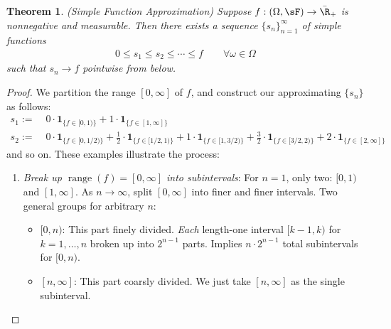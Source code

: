 \documentclass[12pt]{article}
\theoremstyle{plain}
\newtheorem{thm}{Theorem}[section]
\theoremstyle{definition}
\theoremstyle{remark}
\newcommand{\ra}{\rightarrow}
\newcommand{\one}[1]{\mathbf{1}_{#1}}
\newcommand{\range}{\operatorname{range}}
\newcommand{\ninf}{_{n=1}^\infty}
\begin{document}
\begin{thm}\emph{(Simple Function Approximation)}
\label{lebapprox}
Suppose $f: (\Omega,\sF)\rightarrow \bar{\R}_+$ is nonnegative and
measurable. Then there exists a sequence $\{s_n\}\ninf$ of simple
functions
\begin{align*}
    0 \leq s_1 \leq s_2 \leq \cdots \leq f
    \qquad \forall \omega\in \Omega
\end{align*}
such that $s_n\rightarrow f$ pointwise from below.
\end{thm}
\begin{proof}
We partition the range $[0,\infty]$ of $f$, and construct our
approximating $\{s_n\}$ as follows:
\begin{align*}
  s_1 := &\; 0\cdot \one{\{f\in [0,1)\}}
        + 1 \cdot \one{\{f\in [1,\infty]\}} \\
      s_2 :=&\; 0\cdot \one{\{f\in [0,1/2)\}}
        + \frac{1}{2} \cdot \one{\{f\in [1/2,1)\}}
        + 1 \cdot \one{\{f\in [1,3/2)\}}
          + \frac{3}{2} \cdot \one{\{f\in [3/2,2)\}}
        + 2 \cdot \one{\{f\in [2,\infty]\}}
\end{align*}
and so on.
These examples illustrate the process:
\begin{enumerate}[label=(\roman*)]
  \item \emph{Break up $\range(f)=[0,\infty]$ into subintervals}:
    For $n=1$, only two: $[0,1)$ and $[1,\infty]$.
    As $n\ra\infty$, split $[0,\infty]$ into finer and finer intervals.
    Two general groups for arbitrary $n$:
    \begin{itemize}
      \item $[0,n)$: This part finely divided.
        \emph{Each} length-one interval $[k-1,k)$ for $k=1,\ldots,n$
        broken up into $2^{n-1}$ parts.
        Implies $n\cdot 2^{n-1}$ total subintervals for $[0,n)$.
      \item $[n,\infty]$: This part coarsly divided. We
        just take $[n,\infty]$ as the single subinterval.

\end{itemize}
\end{enumerate}
\end{proof}
\end{document}
